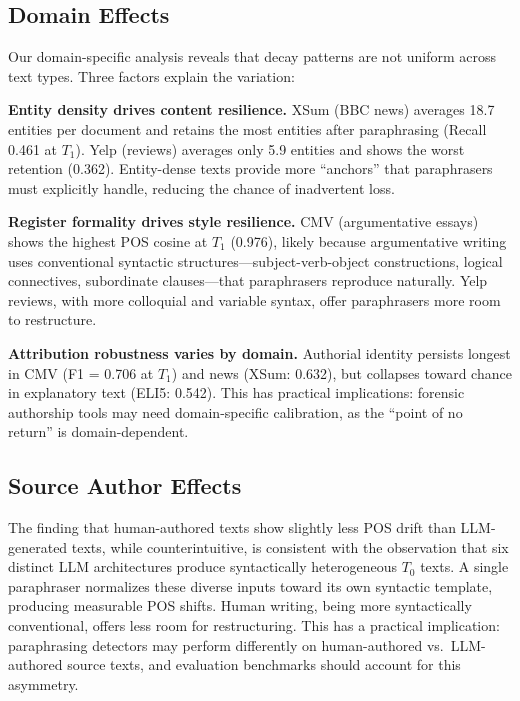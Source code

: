 \subsection{Domain Effects}

Our domain-specific analysis reveals that decay patterns are not uniform across text types. Three factors explain the variation:

\textbf{Entity density drives content resilience.} XSum (BBC news) averages 18.7 entities per document and retains the most entities after paraphrasing (Recall 0.461 at $T_1$). Yelp (reviews) averages only 5.9 entities and shows the worst retention (0.362). Entity-dense texts provide more ``anchors'' that paraphrasers must explicitly handle, reducing the chance of inadvertent loss.

\textbf{Register formality drives style resilience.} CMV (argumentative essays) shows the highest POS cosine at $T_1$ (0.976), likely because argumentative writing uses conventional syntactic structures---subject-verb-object constructions, logical connectives, subordinate clauses---that paraphrasers reproduce naturally. Yelp reviews, with more colloquial and variable syntax, offer paraphrasers more room to restructure.

\textbf{Attribution robustness varies by domain.} Authorial identity persists longest in CMV (F1 = 0.706 at $T_1$) and news (XSum: 0.632), but collapses toward chance in explanatory text (ELI5: 0.542). This has practical implications: forensic authorship tools may need domain-specific calibration, as the ``point of no return'' is domain-dependent.

\subsection{Source Author Effects}

The finding that human-authored texts show slightly less POS drift than LLM-generated texts, while counterintuitive, is consistent with the observation that six distinct LLM architectures produce syntactically heterogeneous $T_0$ texts. A single paraphraser normalizes these diverse inputs toward its own syntactic template, producing measurable POS shifts. Human writing, being more syntactically conventional, offers less room for restructuring. This has a practical implication: paraphrasing detectors may perform differently on human-authored vs.\ LLM-authored source texts, and evaluation benchmarks should account for this asymmetry.

